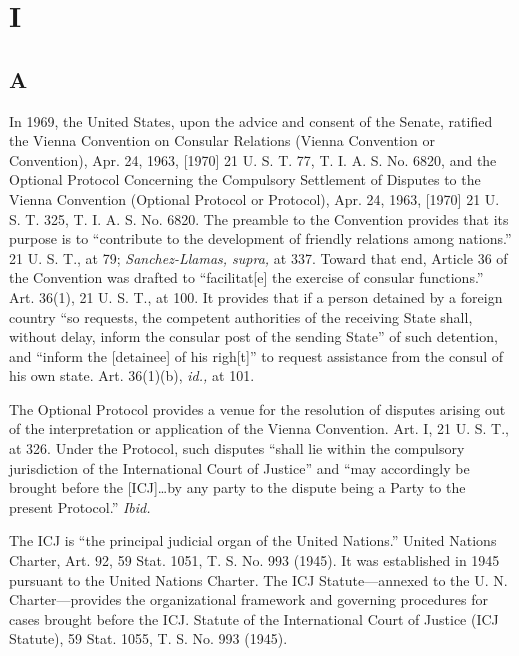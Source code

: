 {\section{I}

\subsection{A}

  In 1969, the United States, upon the advice and consent of the
Senate, ratified the Vienna Convention on Consular Relations (Vienna
Convention or Convention), Apr. 24, 1963, [1970] 21 U. S. T. 77, T. I.
A. S. No. 6820, and the Optional Protocol Concerning the Compulsory
Settlement of Disputes to the Vienna Convention (Optional Protocol
or Protocol), Apr. 24, 1963, [1970] 21 U. S. T. 325, T. I. A. S. No.
6820. The preamble to the Convention provides that its purpose is to
``contribute to the development of friendly relations among nations.''
21 U. S. T., at 79; \emph{Sanchez-Llamas, supra,} at 337. Toward
that end, Article 36 of the Convention was drafted to ``facilitat[e]
the exercise of consular functions.'' Art. 36(1), 21 U. S. T., at
100. It provides that if a person detained by a foreign country ``so
requests, the competent authorities of the receiving State shall,
without delay, inform the consular post of the sending State'' of such
detention, and ``inform the [detainee] of his righ[t]'' to request
assistance from the consul of his own state. Art. 36(1)(b), \emph{id.,}
at 101.

  The Optional Protocol provides a venue for the resolution of disputes
arising out of the interpretation or application of the Vienna
Convention. Art. I, 21 U. S. T., at 326. Under the Protocol,
such disputes ``shall lie within the compulsory jurisdiction of the
International Court of Justice'' and ``may accordingly be brought
before the [ICJ]\dots by any party to the dispute being a Party to
the present Protocol.'' \emph{Ibid.}

  The ICJ is ``the principal judicial organ of the United Nations.''
United Nations Charter, Art. 92, 59 Stat. 1051, T. S. No. 993
(1945). It was established in 1945 pursuant to the United
Nations Charter. The ICJ Statute---annexed to the \newpage  U. N.
Charter---provides the organizational framework and governing procedures
for cases brought before the ICJ. Statute of the International Court
of Justice (ICJ Statute), 59 Stat. 1055, T. S. No. 993 (1945).

}
